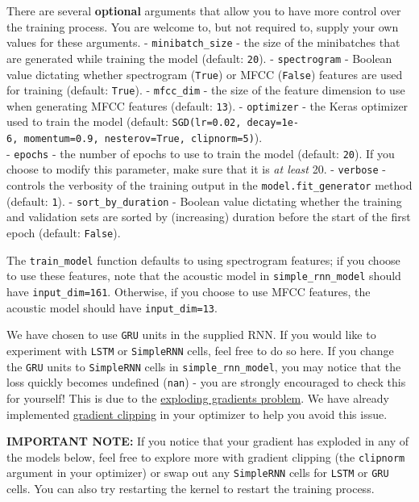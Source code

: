 \documentclass[11pt]{article}
\begin{document}
There are several \textbf{optional} arguments that allow you to have
more control over the training process. You are welcome to, but not
required to, supply your own values for these arguments. -
\texttt{minibatch\_size} - the size of the minibatches that are
generated while training the model (default: \texttt{20}). -
\texttt{spectrogram} - Boolean value dictating whether spectrogram
(\texttt{True}) or MFCC (\texttt{False}) features are used for training
(default: \texttt{True}). - \texttt{mfcc\_dim} - the size of the feature
dimension to use when generating MFCC features (default: \texttt{13}). -
\texttt{optimizer} - the Keras optimizer used to train the model
(default:
\texttt{SGD(lr=0.02,\ decay=1e-6,\ momentum=0.9,\ nesterov=True,\ clipnorm=5)}).\\
- \texttt{epochs} - the number of epochs to use to train the model
(default: \texttt{20}). If you choose to modify this parameter, make
sure that it is \emph{at least} 20. - \texttt{verbose} - controls the
verbosity of the training output in the \texttt{model.fit\_generator}
method (default: \texttt{1}). - \texttt{sort\_by\_duration} - Boolean
value dictating whether the training and validation sets are sorted by
(increasing) duration before the start of the first epoch (default:
\texttt{False}).

The \texttt{train\_model} function defaults to using spectrogram
features; if you choose to use these features, note that the acoustic
model in \texttt{simple\_rnn\_model} should have
\texttt{input\_dim=161}. Otherwise, if you choose to use MFCC features,
the acoustic model should have \texttt{input\_dim=13}.

We have chosen to use \texttt{GRU} units in the supplied RNN. If you
would like to experiment with \texttt{LSTM} or \texttt{SimpleRNN} cells,
feel free to do so here. If you change the \texttt{GRU} units to
\texttt{SimpleRNN} cells in \texttt{simple\_rnn\_model}, you may notice
that the loss quickly becomes undefined (\texttt{nan}) - you are
strongly encouraged to check this for yourself! This is due to the
\href{http://www.wildml.com/2015/10/recurrent-neural-networks-tutorial-part-3-backpropagation-through-time-and-vanishing-gradients/}{exploding
gradients problem}. We have already implemented
\href{https://arxiv.org/pdf/1211.5063.pdf}{gradient clipping} in your
optimizer to help you avoid this issue.

\textbf{IMPORTANT NOTE:} If you notice that your gradient has exploded
in any of the models below, feel free to explore more with gradient
clipping (the \texttt{clipnorm} argument in your optimizer) or swap out
any \texttt{SimpleRNN} cells for \texttt{LSTM} or \texttt{GRU} cells.
You can also try restarting the kernel to restart the training process.
\end{document}
